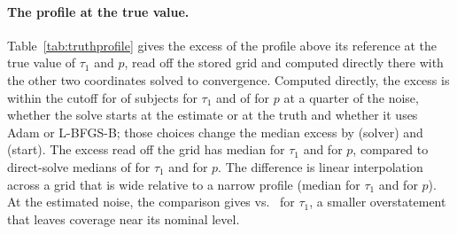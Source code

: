 \paragraph{The profile at the true value.}
Table~\ref{tab:truthprofile} gives the excess of the profile above its reference at the true value of $\tau_1$ and $p$, read
off the stored grid and computed directly there with the other two coordinates solved to convergence. Computed directly, the
excess is within the cutoff for \resTruthQuarterTauDirectWithinCount{} of \resTruthQuarterTauDirectN{} subjects for $\tau_1$
and \resTruthQuarterPDirectWithinCount{} of \resTruthQuarterPDirectN{} for $p$ at a quarter of the noise, whether the solve
starts at the estimate or at the truth and whether it uses Adam or L-BFGS-B; those choices change the median excess by
\resTruthQuarterTauSolver{} (solver) and \resTruthQuarterTauStart{} (start). The excess read off the grid has median
\resTruthQuarterTauStoredMedian{} for $\tau_1$ and \resTruthQuarterPStoredMedian{} for $p$, compared to direct-solve medians of
\resTruthQuarterTauDirectMedian{} for $\tau_1$ and \resTruthQuarterPDirectMedian{} for $p$. The difference is linear
interpolation across a grid that is wide relative to a narrow profile (median \resTruthQuarterTauInterp{} for $\tau_1$ and
\resTruthQuarterPInterp{} for $p$). At the estimated noise, the comparison gives \resTruthExactTauStoredMedian{} vs.\
\resTruthExactTauDirectMedian{} for $\tau_1$, a smaller overstatement that leaves coverage near its nominal level.

